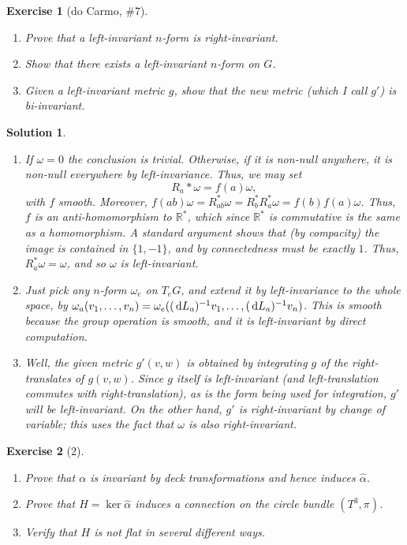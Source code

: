\documentclass{article}
\theoremstyle{plain}
\newtheorem*{ex}{Exercise}
\theoremstyle{nonumberplain}
\newtheorem{sol}{Solution}
\newcommand{\R}{\mathbb{R}}
\begin{document}
\begin{ex}[do Carmo, \#7]
\leavevmode
\begin{enumerate}
\item Prove that a left-invariant $n$-form is right-invariant.
\item Show that there exists a left-invariant $n$-form on $G$.
\item Given a left-invariant metric $g$, show that the new metric (which I call $g'$) is bi-invariant.
\end{enumerate}
\end{ex}

\begin{sol}
\leavevmode
\begin{enumerate}
\item If $\omega = 0$ the conclusion is trivial. Otherwise, if it is non-null anywhere, it is non-null everywhere by left-invariance. Thus, we may set
\begin{equation}
R_a* \omega = f(a) \omega,
\end{equation}
with $f$ smooth. Moreover, $f(ab) \omega = R_{ab}^* \omega = R_b^* R_a^* \omega = f(b) f(a) \omega$. Thus, $f$ is an anti-homomorphism to $\R^*$, which since $\R^*$ is commutative is the same as a homomorphism. A standard argument shows that (by compacity) the image is contained in $\{1,-1\}$, and by connectedness must be exactly $1$. Thus, $R_a^* \omega = \omega$, and so $\omega$ is left-invariant.

\item Just pick any $n$-form $\omega_e$ on $T_e G$, and extend it by left-invariance to the whole space, by $\omega_a(v_1, \dots, v_n) = \omega_e((\dl L_a)^{-1} v_1, \dots, (\dl L_a)^{-1} v_n)$. This is smooth because the group operation is smooth, and it is left-invariant by direct computation.

\item Well, the given metric $g'(v,w)$ is obtained by integrating $g$ of the right-translates of $g(v,w)$. Since $g$ itself is left-invariant (and left-translation commutes with right-translation), as is the form being used for integration, $g'$ will be left-invariant. On the other hand, $g'$ is right-invariant by change of variable; this uses the fact that $\omega$ is also right-invariant.
\end{enumerate}
\end{sol}

\begin{ex}[2]
\leavevmode
\begin{enumerate}
\item Prove that $\alpha$ is invariant by deck transformations and hence induces $\hat \alpha$.
\item Prove that $H = \ker \hat \alpha$ induces a connection on the circle bundle $(T^3, \pi)$.
\item Verify that $H$ is not flat in several different ways.
\end{enumerate}
\end{ex}
\end{document}
